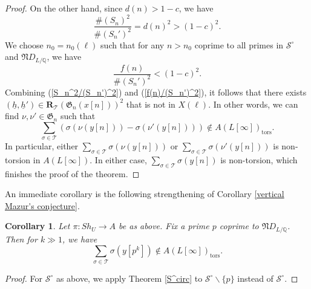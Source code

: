 \documentclass[11pt,oneside,reqno]{amsart}
\newcommand{\Q}{\mathbb{Q}}
\newcommand{\Scal}{\mathcal{S}}
\newcommand{\Tcal}{\mathcal{T}}
\newcommand{\Rbf}{\mathbf{R}}
\newcommand{\Gfrak}{\mathfrak{G}}
\newcommand{\Nfrak}{\mathfrak{N}}
\theoremstyle{plain}
\newtheorem{corollary}[theorem]{Corollary}
\begin{document}
\begin{proof}
		
		
		
		
		
		
		On the other hand, since $d(n)>1-c$, we have
		\begin{equation}\label{S_n^2/(S_n')^2}
			\frac{\#(S_n)^2}{\#(S_n')^2}=d(n)^2>(1-c)^2.
		\end{equation}
		We choose $n_0=n_0(\ell)$ such that for any $n>n_0$ coprime to all primes in $\Scal^\circ$ and $\Nfrak D_{L/\Q}$, we have
		\begin{equation}\label{f(n)/(S_n')^2}
			\frac{f(n)}{\#(S_n')^2}<(1-c)^2.
		\end{equation}
		Combining (\ref{S_n^2/(S_n')^2}) and (\ref{f(n)/(S_n')^2}), it follows that there exists $(\underline{h},\underline{h}')\in\Rbf_{\Tcal}(\Gfrak_n(x[n]))^2$ that is not in $X(\ell)$. In other words, we can find $\nu,\nu'\in\Gfrak_n$ such that
		\[
		\sum_{\sigma\in\Tcal}(\sigma(\nu(y[n]))-\sigma(\nu'(y[n])))\notin
		A(L[\infty])_\mathrm{tors}.
		\]
		In particular, either $\sum_{\sigma\in\Tcal}\sigma(\nu(y[n]))$ or $\sum_{\sigma\in\Tcal}\sigma(\nu'(y[n]))$ is non-torsion in $A(L[\infty])$. In either case, $\sum_{\sigma\in\Tcal}\sigma(y[n])$ is non-torsion, which finishes the proof of the theorem.
	\end{proof}
	
	
	An immediate corollary is the following strengthening of Corollary \ref{vertical Mazur's conjecture}.
	\begin{corollary}\label{vertical Mazur's conjecture, stronger version}
		Let $\pi\colon Sh_U\to A$ be as above. Fix a prime $p$ coprime to $\Nfrak D_{L/\Q}$. Then for $k\gg1$, we have
		\[
		\sum_{\sigma\in\Tcal}\sigma(y[p^k])
		\notin
		A(L[\infty])_\mathrm{tors}.
		\]
	\end{corollary}
	\begin{proof}
		For $\Scal^\circ$ as above, we apply Theorem \ref{S^circ} to $\Scal^\circ\backslash\{p\}$ instead of $\Scal^\circ$.
	\end{proof}
	
	
	
	
	
	
	
	
	
	
	
	
	
	
	
	
	
	
	
\end{document}
